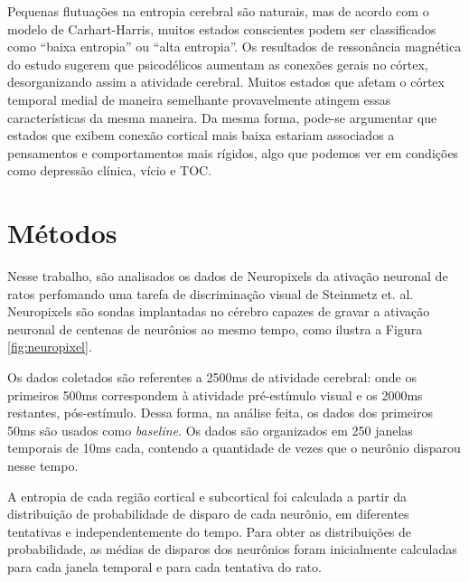 \documentclass[conference]{IEEEtran}
\begin{document}
Pequenas flutuações na entropia cerebral são naturais, mas de acordo com o modelo de Carhart-Harris, muitos estados conscientes podem ser classificados como ``baixa entropia'' ou ``alta entropia''. Os resultados de ressonância magnética do estudo sugerem que psicodélicos aumentam as conexões gerais no córtex, desorganizando assim a atividade cerebral. Muitos estados que afetam o córtex temporal medial de maneira semelhante provavelmente atingem essas características da mesma maneira. Da mesma forma, pode-se argumentar que estados que exibem conexão cortical mais baixa estariam associados a pensamentos e comportamentos mais rígidos, algo que podemos ver em condições como depressão clínica, vício e TOC.

\section{Métodos}

Nesse trabalho, são analisados os dados de Neuropixels da ativação neuronal de ratos perfomando uma tarefa de discriminação visual de Steinmetz et. al\cite{steinmetz}. Neuropixels são sondas implantadas no cérebro capazes de gravar a ativação neuronal de centenas de neurônios ao mesmo tempo, como ilustra a Figura \ref{fig:neuropixel}.




Os dados coletados são referentes a 2500ms de atividade cerebral: onde os primeiros 500ms correspondem à atividade pré-estímulo visual e os 2000ms restantes, pós-estímulo. Dessa forma, na análise feita, os dados dos primeiros 50ms são usados como \textit{baseline}. Os dados são organizados em 250 janelas temporais de 10ms cada, contendo a quantidade de vezes que o neurônio disparou nesse tempo.

A entropia de cada região cortical e subcortical foi calculada a partir da distribuição de probabilidade de disparo de cada neurônio, em diferentes tentativas e independentemente do tempo. Para obter as distribuições de probabilidade, as médias de disparos dos neurônios foram inicialmente calculadas para cada janela temporal e para cada tentativa do rato.
\end{document}
